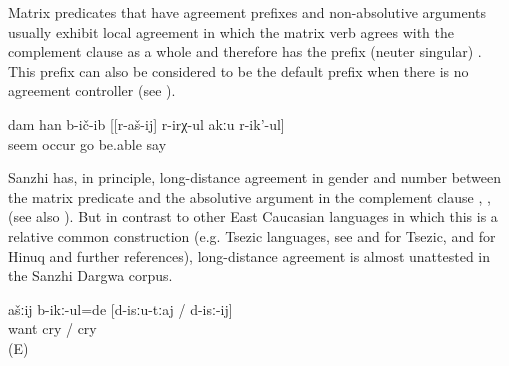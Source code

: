 Matrix predicates that have agreement prefixes and non-absolutive arguments usually exhibit local agreement in which the matrix verb agrees with the complement clause as a whole and therefore has the prefix  (neuter singular) . This prefix can also be considered to be the default prefix when there is no agreement controller (see ).
%
\begin{exe}
	\ex	\label{ex:‎I thought that she cannot walk}
	\gll	dam	han	b-ič-ib	[[r-aš-ij]	r-irχ-ul	akːu	r-ik'-ul]\\
			seem	occur	\tsc{f-}go be.able		say\\
	\glt	{}
\end{exe}

Sanzhi has, in principle, long-distance agreement in gender and number between the matrix predicate and the absolutive argument in the complement clause , ,  (see also ). But in contrast to other East Caucasian languages in which this is a relative common construction (e.g. Tsezic languages, see \citealp{Polinsky.Potsdam2001} and \citealp{Polinsky2003} for Tsezic, and \citealp[628]{Forker2013a} for Hinuq and further references), long-distance agreement is almost unattested in the Sanzhi Dargwa corpus. 
%
\begin{exe}
	\ex	\label{ex:You wanted to cry1}
	\gll	ašːij	b-ikː-ul=de	[d-isːu-tːaj	/	d-isː-ij]\\
			want	cry	/	cry\\
	\glt	{} (E)
\end{exe}

